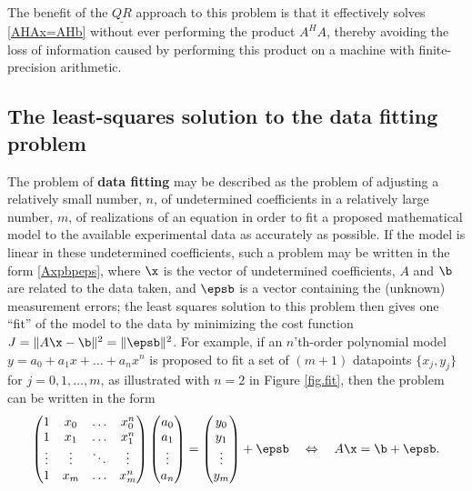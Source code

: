 The benefit of the $\underline{QR}$ approach to this problem is that it
effectively solves \eqref{AHAx=AHb} without ever performing the product
$A^H A$, thereby avoiding the loss of information caused by performing
this product on a machine with finite-precision arithmetic.  %

\subsection{The least-squares solution to the data fitting problem}\label{sec.A.E.B}

The problem of {\bf data fitting} may be described as the problem of
adjusting a relatively small number, $n$, of undetermined coefficients
in a relatively large number, $m$, of realizations of an equation in
order to fit a proposed mathematical model to the available
experimental data as accurately as possible.  If the model is linear
in these undetermined coefficients, such a problem may be written in
the form \eqref{Axpbpeps}, where $\x$ is the vector of undetermined
coefficients, $A$ and $\b$ are related to the data taken, and $\epsb$
is a vector containing the (unknown) measurement errors; the least
squares solution to this problem then gives one ``fit'' of the model
to the data by minimizing the cost function $J=\Vert A\x - \b
\Vert^{2} = \Vert \epsb \Vert^{2}$.  For example, if an $n$'th-order polynomial model
$y=a_0+a_{1} x+ \ldots + a_{n} x^n$ is proposed to fit a set of $(m+1)$ datapoints
$\{x_{j},y_{j}\}$ for $j=0,1,\ldots,m$, as illustrated with $n=2$ in Figure \ref{fig.fit},
then the problem can be written in the form
\begin{equation*}
    \begin{pmatrix} 1 & x_{0} & \ldots & x_{0}^n \\ 1 & x_{1} & \ldots & x_{1}^n \\ \vdots & \vdots & \ddots & \vdots
    \\ 1 & x_{m} & \ldots & x_{m}^n \end{pmatrix}
    \begin{pmatrix} a_{0} \\ a_{1} \\ \vdots \\ a_{n} \end{pmatrix}
	= \begin{pmatrix} y_{0} \\ y_{1} \\ \vdots \\ y_{m} \end{pmatrix}+\epsb \quad \Leftrightarrow \quad A\x=\b+\epsb.
\end{equation*}
